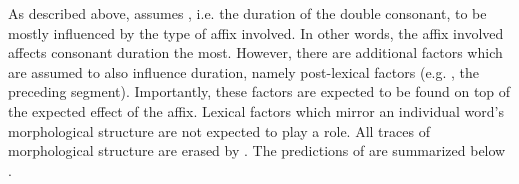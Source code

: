 As described above,  assumes , i.e. the duration of the double consonant, to be mostly influenced by the type of affix involved. In other words, the affix involved affects consonant duration the most. However, there are additional factors which are assumed to also influence duration, namely post-lexical factors (e.g. , the preceding segment). Importantly, these factors are expected to be found on top of the expected effect of the affix. Lexical factors which mirror an individual word's morphological structure are not expected to play a role. All traces of morphological structure are erased by . 
The predictions of  are summarized below .



